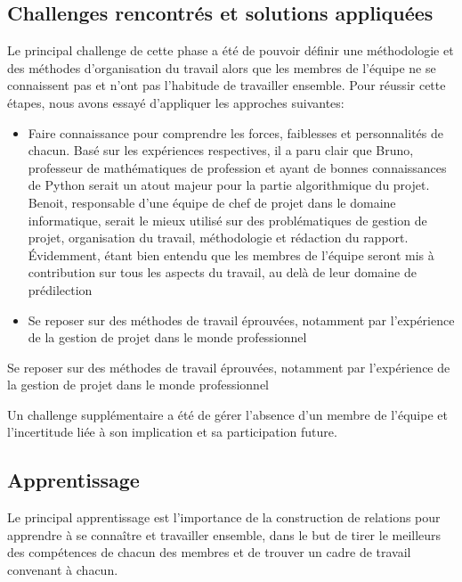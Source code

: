 \subsection{Challenges rencontrés et solutions appliquées}

Le principal challenge de cette phase a été de pouvoir définir une méthodologie et des méthodes d'organisation du travail alors que 
les membres de l'équipe ne se connaissent pas et n’ont pas l’habitude de travailler ensemble.
Pour réussir cette étapes, nous avons essayé d’appliquer les approches suivantes:
\begin{itemize}
    \item Faire connaissance pour comprendre les forces, faiblesses et personnalités de chacun. Basé sur les expériences respectives, 
    il a paru clair que Bruno, professeur de mathématiques de profession et ayant de bonnes connaissances 
    de Python serait un atout majeur pour la partie algorithmique du projet. Benoit, responsable d’une équipe de chef de projet 
    dans le domaine informatique, serait le mieux utilisé sur des problématiques de gestion de projet, organisation du travail, 
    méthodologie et rédaction du rapport. Évidemment, étant bien entendu que les membres de l'équipe seront mis à contribution 
    sur tous les aspects du travail, au delà de leur domaine de prédilection
    \item Se reposer sur des méthodes de travail éprouvées, notamment par l'expérience de la gestion de projet dans le monde professionnel 

\end{itemize}
Se reposer sur des méthodes de travail éprouvées, notamment par l'expérience de la gestion de projet dans le monde professionnel 

Un challenge supplémentaire a été de gérer l’absence d’un membre de l'équipe et l’incertitude liée à son implication et sa participation future.

\subsection{Apprentissage}

Le principal apprentissage est l'importance de la construction de relations pour apprendre à se connaître et travailler ensemble, 
dans le but de tirer le meilleurs des compétences de chacun des membres et de trouver un cadre de travail convenant à chacun.
